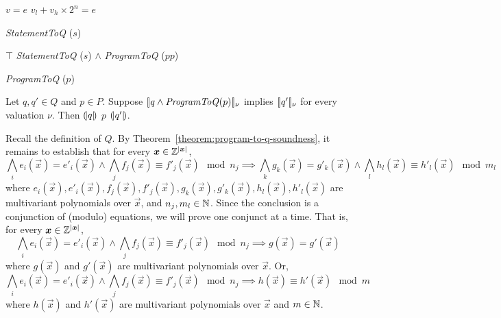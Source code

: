 
\begin{algorithm}
  \begin{algorithmic}[1]
        \Return $v = e$
      \EndCase
        \Return $v_l + v_h \times 2^n = e$
      \EndCase
    \EndMatch
  \end{algorithmic}
  \caption{\textit{StatementToQ} ($s$)}
\end{algorithm}

\begin{algorithm}
  \begin{algorithmic}[1]
      \Case{$\epsilon$} \Return $\top$ \EndCase
        \Return \textit{StatementToQ} ($s$) $\wedge$
                \textit{ProgramToQ} ($pp$)
      \EndCase
    \EndMatch
  \end{algorithmic}
  \caption{\textit{ProgramToQ} ($p$)}
  \label{algorithm:programtoq}
\end{algorithm}

\begin{theorem}
  \label{theorem:program-to-q-soundness}
  Let $q, q' \in Q$ and $p \in P$.
  Suppose $[\!|{q \wedge \textmd{\textit{ProgramToQ}}(p)}|\!]_\nu$
  implies $[\!|{q'}|\!]_\nu$ for every valuation $\nu$. 
  Then ${(\!|}{q}{|\!)}$ $p$ ${(\!|}{q'}{|\!)}$.
\end{theorem}

Recall the definition of $Q$. By
Theorem~\ref{theorem:program-to-q-soundness}, it remains to establish
that for every $\vec{x} \in \bbfZ^{|\vec{x}|}$, 
\[
  \bigwedge\limits_i e_i (\vec{x}) = e'_i (\vec{x}) \wedge
  \bigwedge\limits_j f_j (\vec{x}) \equiv f'_j (\vec{x}) \mod n_j
  \implies
  \bigwedge\limits_k g_k (\vec{x}) = g'_k (\vec{x}) \wedge
  \bigwedge\limits_l   h_l (\vec{x}) \equiv h'_l (\vec{x}) \mod m_l
\]
where
$e_i (\vec{x}), e'_i (\vec{x}), f_j (\vec{x}), f'_j (\vec{x}),
 g_k (\vec{x}), g'_k (\vec{x}), h_l (\vec{x}), h'_l (\vec{x})$
are multivariant polynomials over $\vec{x}$, and
$n_j, m_l \in \mathbb{N} $. Since the conclusion is a conjunction of
(modulo) equations, we will prove one conjunct at a time. That is, for
every $\vec{x} \in \bbfZ^{|\vec{x}|}$, 
\[
  \bigwedge\limits_i e_i (\vec{x}) = e'_i (\vec{x}) \wedge
  \bigwedge\limits_j f_j (\vec{x}) \equiv f'_j (\vec{x}) \mod n_j
  \implies
  g (\vec{x}) = g' (\vec{x})
\] where $g (\vec{x})$ and $g' (\vec{x})$ are multivariant polynomials
over $\vec{x}$. Or,
\[
  \bigwedge\limits_i e_i (\vec{x}) = e'_i (\vec{x}) \wedge
  \bigwedge\limits_j f_j (\vec{x}) \equiv f'_j (\vec{x}) \mod n_j
  \implies
  h (\vec{x}) \equiv h' (\vec{x}) \mod m
\] where $h (\vec{x})$ and $h' (\vec{x})$ are multivariant polynomials
over $\vec{x}$ and $m \in \mathbb{N}$.
